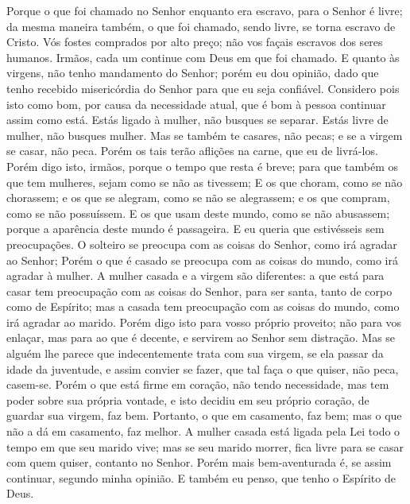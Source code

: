 {  Porque o que foi chamado no Senhor enquanto era escravo, para o Senhor é livre; da mesma maneira também, o que foi chamado, sendo livre, se torna escravo de Cristo.
  Vós fostes comprados por alto preço;
{} não vos façais escravos dos seres humanos.
  Irmãos, cada um continue com Deus
{} em que foi chamado.
  E quanto às virgens, não tenho mandamento do Senhor; porém eu dou
{} opinião, dado que tenho recebido misericórdia do Senhor para que eu seja confiável.
  Considero pois isto como bom, por causa da necessidade atual, que é bom à pessoa continuar assim como está.
  Estás ligado à mulher, não busques se separar. Estás livre de mulher, não busques mulher.
  Mas se também te casares, não pecas; e se a virgem se casar, não peca. Porém os tais terão aflições na carne, que eu
{} de livrá-los.
  Porém digo isto, irmãos, porque o tempo que resta é breve; para que também os que tem mulheres, sejam como se não as tivessem;
  E os que choram, como se não chorassem; e os que se alegram, como se não se alegrassem; e os que compram, como se não possuíssem.
  E os que usam
{} deste mundo, como se
{} não abusassem; porque a aparência deste mundo é passageira.
  E eu queria que estivésseis sem preocupações. O solteiro se preocupa com as coisas do Senhor, como irá agradar ao Senhor;
  Porém o que é casado se preocupa com as coisas do mundo, como irá agradar à mulher.
  A mulher casada e a virgem são diferentes: a que está para casar tem preocupação com as coisas do Senhor, para ser santa, tanto de corpo como de Espírito; mas a casada tem preocupação com as coisas do mundo, como irá agradar ao marido.
  Porém digo isto para vosso próprio proveito; não para vos enlaçar, mas para
{} ao que é decente, e servirem ao Senhor sem distração.
  Mas se alguém lhe parece que indecentemente trata com sua virgem, se ela passar da idade da juventude, e assim convier se fazer, que tal faça o que quiser, não peca, casem-se.
  Porém o que está firme em
{} coração, não tendo necessidade, mas tem poder sobre sua própria vontade, e isto decidiu em seu próprio coração, de guardar sua virgem, faz bem.
  Portanto, o que
{} em casamento, faz bem; mas o que não a dá em casamento, faz melhor.
  A mulher casada está ligada pela Lei todo o tempo em que seu marido vive; mas se seu marido morrer, fica livre para se casar com quem quiser, contanto
{} no Senhor.
  Porém mais bem-aventurada é, se assim continuar, segundo minha opinião. E também eu penso, que tenho o Espírito de Deus.
\par }


